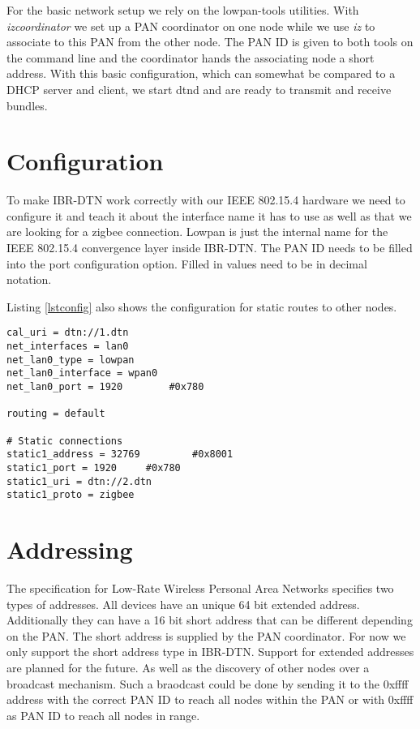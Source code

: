 For the basic network setup we rely on the lowpan-tools utilities. With
\emph{izcoordinator} we set up a PAN coordinator on one
node while we use \emph{iz} to associate to this PAN from the other node. The PAN ID is
given to both tools on the command line and the coordinator hands the
associating node a short address. With this basic configuration, which can
somewhat be compared to a DHCP server and client, we start dtnd and are ready to
transmit and receive bundles.

\section{Configuration}

To make IBR-DTN work correctly with our IEEE 802.15.4 hardware we need to configure
it and teach it about the interface name it has to use as well as that we are
looking for a zigbee connection. Lowpan is just the internal name for the
IEEE 802.15.4 convergence layer inside IBR-DTN. The PAN ID needs to be filled into the
port configuration option. Filled in values need to be in decimal notation.

Listing \ref{lstconfig} also shows the configuration for static routes to other
nodes.

\begin{lstlisting}[caption= dtnd example configuration, label=lstconfig]
cal_uri = dtn://1.dtn
net_interfaces = lan0
net_lan0_type = lowpan
net_lan0_interface = wpan0
net_lan0_port = 1920		#0x780

routing = default

# Static connections
static1_address = 32769         #0x8001
static1_port = 1920		#0x780
static1_uri = dtn://2.dtn
static1_proto = zigbee
\end{lstlisting}

\section{Addressing}

The specification for Low-Rate Wireless Personal Area Networks specifies two
types of addresses. All devices have an unique 64 bit extended address.
Additionally they can have a 16 bit short address that can be different depending
on the PAN. The short address is supplied by the PAN coordinator. For now we
only support the short address type in IBR-DTN. Support for extended addresses
are planned for the future. As well as the discovery of other nodes over a
broadcast mechanism. Such a braodcast could be done by sending it to the 0xffff
address with the correct PAN ID to reach all nodes within the PAN or with 0xffff
as PAN ID to reach all nodes in range.

